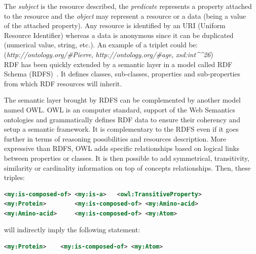 \documentclass{vgtc}                          %
\begin{document}
The \textit{subject} is the resource described, the \textit{predicate} represents a property attached to the resource and the \textit{object} may represent a resource or a data (being a value of the attached property). Any resource is identified by an URI (Uniform Resource Identifier) whereas a data is anonymous since it can be duplicated (numerical value, string, etc.). An example of a triplet could be:
\\
(\textit{http://ontology.org/\#Pierre}, \textit{http://ontology.org/\#age}, \textit{xsd:int\^{}\^{}26})
\\
RDF has been quickly extended by a semantic layer in a model called RDF Schema (RDFS)~\cite{brickley2004rdf}. It defines classes, sub-classes, properties and sub-properties from which RDF resources will inherit. 

The semantic layer brought by RDFS can be complemented by another model named OWL. OWL is an computer standard, support of the Web Semantics ontologies and grammatically defines RDF data to ensure their coherency and setup a semantic framework. It is complementary to the RDFS even if it goes further in terms of reasoning possibilities and resources description. More expressive than RDFS, OWL adds specific relationships based on logical links between properties or classes. It is then possible to add symmetrical, transitivity, similarity or cardinality information on top of concepts relationships.
Then, these triples:
\begin{lstlisting}[language=XML]
<my:is-composed-of>	<my:is-a>	<owl:TransitiveProperty>
<my:Protein>		<my:is-composed-of>	<my:Amino-acid>
<my:Amino-acid>		<my:is-composed-of>	<my:Atom>
\end{lstlisting}
will indirectly imply the following statement:
\begin{lstlisting}[language=XML]
<my:Protein>	<my:is-composed-of>	<my:Atom>
\end{lstlisting}
\end{document}
